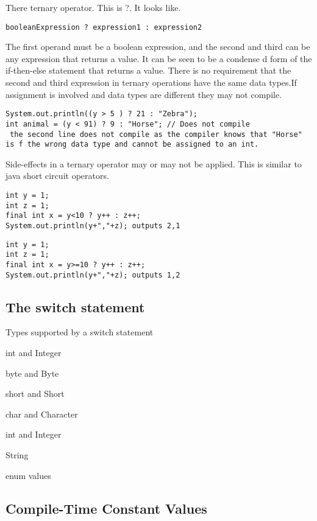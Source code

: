 \documentclass[a4paper]{report}   %
\begin{document}
There ternary operator. This is ?. It looks like.

\begin{lstlisting}
booleanExpression ? expression1 : expression2
\end{lstlisting}

The first operand must be a boolean expression, and the second and third can be any expression that returns a value. It can be seen to be a condense d form of the if-then-else statement that returns a value. There is no requirement that the second and third expression in ternary operations have the same data types.If assignment is involved and data types are different they may not compile.

\begin{lstlisting}
System.out.println((y > 5 ) ? 21 : "Zebra");
int animal = (y < 91) ? 9 : "Horse"; // Does not compile
 the second line does not compile as the compiler knows that "Horse" is f the wrong data type and cannot be assigned to an int.
\end{lstlisting}

Side-effects in a ternary operator may or may not be applied. This is similar to java short circuit operators.

\begin{lstlisting}
int y = 1;
int z = 1;
final int x = y<10 ? y++ : z++;
System.out.println(y+","+z); outputs 2,1
\end{lstlisting}

\begin{lstlisting}
int y = 1;
int z = 1;
final int x = y>=10 ? y++ : z++;
System.out.println(y+","+z); outputs 1,2
\end{lstlisting}

\subsection{The switch statement}
Types supported by a switch statement
\begin{list}{•}{•}
\item int and Integer
\item byte and Byte
\item short and Short
\item char and Character 
\item int and Integer
\item String
\item enum values
\end{list}

\subsection{Compile-Time Constant Values}
\end{document}
